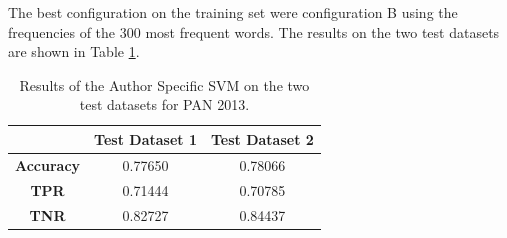 The best configuration on the training set were configuration B using the
frequencies of the 300 most frequent words. The results on the two test datasets
are shown in Table \ref{table:svm_results}.

\begin{table}
    \centering
    \begin{tabular}{c|cc}
        & \textbf{Test Dataset 1} & \textbf{Test Dataset 2} \\
        \hline
        \textbf{Accuracy}  & 0.77650 & 0.78066 \\
        \textbf{\gls{TPR}} & 0.71444 & 0.70785 \\
        \textbf{\gls{TNR}} & 0.82727 & 0.84437
    \end{tabular}
    \caption{Results of the Author Specific SVM on the two test datasets for PAN
    2013.}
    \label{table:svm_results}
\end{table}
